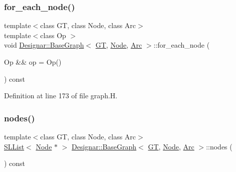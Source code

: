 \subsubsection{\texorpdfstring{for\+\_\+each\+\_\+node()}{for\_each\_node()}\hspace{0.1cm}{\footnotesize\ttfamily [2/2]}}
{\footnotesize\ttfamily template$<$class GT, class Node, class Arc$>$ \\
template$<$class Op $>$ \\
void \hyperlink{class_designar_1_1_base_graph}{Designar\+::\+Base\+Graph}$<$ \hyperlink{demo-buildgraph_8_c_a3001c40d2c31ca87ed96cd7d1334a55e}{GT}, \hyperlink{namespace_designar_a5af326c65aa2bd26b26c410f2030d09e}{Node}, \hyperlink{namespace_designar_a3f55fb5513d62ff47cbc8f72b8e95d6f}{Arc} $>$\+::for\+\_\+each\+\_\+node (\begin{DoxyParamCaption}\item[{Op \&\&}]{op = {\ttfamily Op()} }\end{DoxyParamCaption}) const\hspace{0.3cm}{\ttfamily [inline]}}



Definition at line 173 of file graph.\+H.

\mbox{\label{class_designar_1_1_base_graph_a56b1ec4a0258d9f22542f33615bcdbea}} 
\subsubsection{\texorpdfstring{nodes()}{nodes()}}
{\footnotesize\ttfamily template$<$class GT, class Node, class Arc$>$ \\
\hyperlink{class_designar_1_1_s_l_list}{S\+L\+List}$<$ \hyperlink{namespace_designar_a5af326c65aa2bd26b26c410f2030d09e}{Node} $\ast$ $>$ \hyperlink{class_designar_1_1_base_graph}{Designar\+::\+Base\+Graph}$<$ \hyperlink{demo-buildgraph_8_c_a3001c40d2c31ca87ed96cd7d1334a55e}{GT}, \hyperlink{namespace_designar_a5af326c65aa2bd26b26c410f2030d09e}{Node}, \hyperlink{namespace_designar_a3f55fb5513d62ff47cbc8f72b8e95d6f}{Arc} $>$\+::nodes (\begin{DoxyParamCaption}{ }\end{DoxyParamCaption}) const\hspace{0.3cm}{\ttfamily [inline]}}



